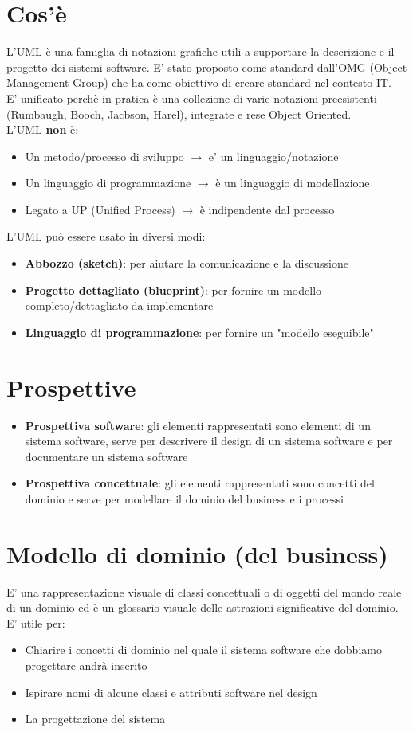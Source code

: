 \documentclass[12pt, a4paper]{report}
\begin{document}
\section{Cos'è}
L'UML è una famiglia di notazioni grafiche utili a supportare la descrizione e il progetto dei sistemi software. E' stato proposto come standard dall'OMG (Object Management Group) che ha come obiettivo di creare standard nel contesto IT.\\
E' unificato perchè in pratica è una collezione di varie notazioni preesistenti (Rumbaugh, Booch, Jacbson, Harel), integrate e rese Object Oriented.\\
L'UML \textbf{non} è:
\begin{itemize}
    \item Un metodo/processo di sviluppo $\rightarrow$ e' un linguaggio/notazione
    \item Un linguaggio di programmazione $\rightarrow$ è un linguaggio di modellazione
    \item Legato a UP (Unified Process) $\rightarrow$ è indipendente dal processo
\end{itemize}
L'UML può essere usato in diversi modi: 
\begin{itemize}
    \item \textbf{Abbozzo (sketch)}: per aiutare la comunicazione e la discussione
    \item \textbf{Progetto dettagliato (blueprint)}: per fornire un modello completo/dettagliato da implementare
    \item \textbf{Linguaggio di programmazione}: per fornire un "modello eseguibile"
\end{itemize}
\section{Prospettive}
\begin{itemize}
    \item \textbf{Prospettiva software}: gli elementi rappresentati sono elementi di un sistema software, serve per descrivere il design di un sistema software e per documentare un sistema software
    \item \textbf{Prospettiva concettuale}: gli elementi rappresentati sono concetti del dominio e serve per modellare il dominio del business e i processi
\end{itemize}
\section{Modello di dominio (del business)}
E' una rappresentazione visuale di classi concettuali o di oggetti del mondo reale di un dominio ed è un glossario visuale delle astrazioni significative del dominio.\\
E' utile per:
\begin{itemize}
    \item Chiarire i concetti di dominio nel quale il sistema software che dobbiamo progettare andrà inserito
    \item Ispirare nomi di alcune classi e attributi software nel design
    \item La progettazione del sistema
\end{itemize}
\end{document}
